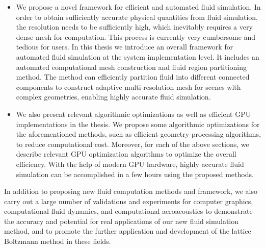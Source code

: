 \begin{abstract*}[flattitle]
\begin{itemize}
    \item We propose a novel framework for efficient and automated fluid simulation. In order to obtain sufficiently accurate physical quantities from fluid simulation, the resolution needs to be sufficiently high, which inevitably requires a very dense mesh for computation. This process is currently very cumbersome and tedious for users. In this thesis we introduce an overall framework for automated fluid simulation at the system implementation level. It includes an automated computational mesh construction and fluid region partitioning method. The method can efficiently partition fluid into different connected components to construct adaptive multi-resolution mesh for scenes with complex geometries, enabling highly accurate fluid simulation.
    \item We also present relevant algorithmic optimizations as well as efficient GPU implementations in the thesis. We propose some algorithmic optimizations for the aforementioned methods, such as efficient geometry processing algorithms, to reduce computational cost. Moreover, for each of the above sections, we describe relevant GPU optimization algorithms to optimize the overall efficiency. With the help of modern GPU hardware, highly accurate fluid simulation can be accomplished in a few hours using the proposed methods.
  \end{itemize}

  In addition to proposing new fluid computation methods and framework, we also carry out a large number of validations and experiments for computer graphics, computational fluid dynamics, and computational aeroacoustics to demonstrate the accuracy and potential for real applications of our new fluid simulation method, and to promote the further application and development of the lattice Boltzmann method in these fields.
\end{abstract*}